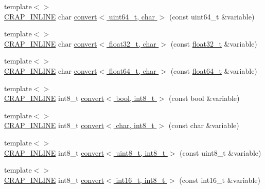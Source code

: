 \begin{DoxyCompactItemize}
\item 
{\footnotesize template$<$$>$ }\\\hyperlink{config__x86_8h_a5a40526b8d842e7ff731509998bb0f1c}{C\+R\+A\+P\+\_\+\+I\+N\+L\+I\+N\+E} char \hyperlink{namespacecrap_af085807d92a8c61895e5dd2550986a14}{convert$<$ uint64\+\_\+t, char $>$} (const uint64\+\_\+t \&variable)
\item 
{\footnotesize template$<$$>$ }\\\hyperlink{config__x86_8h_a5a40526b8d842e7ff731509998bb0f1c}{C\+R\+A\+P\+\_\+\+I\+N\+L\+I\+N\+E} char \hyperlink{namespacecrap_a314be432b9d79f6eafcfa30f05e4dcb1}{convert$<$ float32\+\_\+t, char $>$} (const \hyperlink{crap__types_8h_a4611b605e45ab401f02cab15c5e38715}{float32\+\_\+t} \&variable)
\item 
{\footnotesize template$<$$>$ }\\\hyperlink{config__x86_8h_a5a40526b8d842e7ff731509998bb0f1c}{C\+R\+A\+P\+\_\+\+I\+N\+L\+I\+N\+E} char \hyperlink{namespacecrap_a7d9ef15780d792725f0316fac0baa6ee}{convert$<$ float64\+\_\+t, char $>$} (const \hyperlink{crap__types_8h_ac55f3ae81b5bc9053760baacf57e47f4}{float64\+\_\+t} \&variable)
\item 
{\footnotesize template$<$$>$ }\\\hyperlink{config__x86_8h_a5a40526b8d842e7ff731509998bb0f1c}{C\+R\+A\+P\+\_\+\+I\+N\+L\+I\+N\+E} int8\+\_\+t \hyperlink{namespacecrap_a3fea5b7404f5a1ac55e4bed006610f5c}{convert$<$ bool, int8\+\_\+t $>$} (const bool \&variable)
\item 
{\footnotesize template$<$$>$ }\\\hyperlink{config__x86_8h_a5a40526b8d842e7ff731509998bb0f1c}{C\+R\+A\+P\+\_\+\+I\+N\+L\+I\+N\+E} int8\+\_\+t \hyperlink{namespacecrap_a7f3cc093da003ca8ae653016ec817f90}{convert$<$ char, int8\+\_\+t $>$} (const char \&variable)
\item 
{\footnotesize template$<$$>$ }\\\hyperlink{config__x86_8h_a5a40526b8d842e7ff731509998bb0f1c}{C\+R\+A\+P\+\_\+\+I\+N\+L\+I\+N\+E} int8\+\_\+t \hyperlink{namespacecrap_ab413a497df50e1b19ceaab87696acab2}{convert$<$ uint8\+\_\+t, int8\+\_\+t $>$} (const uint8\+\_\+t \&variable)
\item 
{\footnotesize template$<$$>$ }\\\hyperlink{config__x86_8h_a5a40526b8d842e7ff731509998bb0f1c}{C\+R\+A\+P\+\_\+\+I\+N\+L\+I\+N\+E} int8\+\_\+t \hyperlink{namespacecrap_ac2e5eaef53a4ca33288c2e6b37df0685}{convert$<$ int16\+\_\+t, int8\+\_\+t $>$} (const int16\+\_\+t \&variable)

\end{DoxyCompactItemize}
